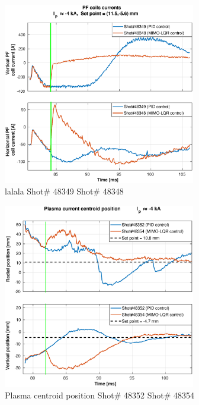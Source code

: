 \begin{figure}
	\centering
	\includegraphics[width=0.75\textwidth]{Chp5/PIDvsMIMO_349_348_curr_2.eps}
	\caption{lalala Shot\# 48349 Shot\# 48348}
\end{figure}


\begin{figure}
	\centering
	\includegraphics[width=0.75\textwidth]{Chp5/PIDvsMIMO_352_354_2.eps}
	\caption{Plasma centroid position Shot\# 48352 Shot\# 48354}
\end{figure}

